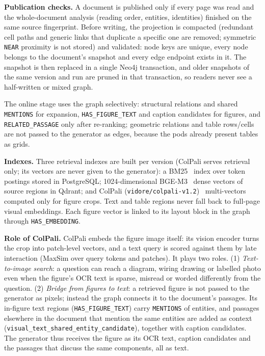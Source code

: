 \documentclass[conference]{IEEEtran}
\begin{document}
\textbf{Publication checks.} A document is published only if every page was read and the whole-document analysis (reading order, entities, identities) finished on the same source fingerprint. Before writing, the projection is compacted (redundant cell paths and generic links that duplicate a specific one are removed; symmetric \texttt{NEAR} proximity is not stored) and validated: node keys are unique, every node belongs to the document's snapshot and every edge endpoint exists in it. The snapshot is then replaced in a single Neo4j transaction, and older snapshots of the same version and run are pruned in that transaction, so readers never see a half-written or mixed graph.

The online stage uses the graph selectively: structural relations and shared \texttt{MENTIONS} for expansion, \texttt{HAS\_FIGURE\_TEXT} and caption candidates for figures, and \texttt{RELATED\_PASSAGE} only after re-ranking; geometric relations and table rows/cells are not passed to the generator as edges, because the pods already present tables as grids.

\textbf{Indexes.} Three retrieval indexes are built per version (ColPali serves retrieval only; its vectors are never given to the generator): a BM25~\cite{robertson2009bm25} index over token postings stored in PostgreSQL; 1024-dimensional BGE-M3~\cite{chen2024bgem3} dense vectors of source regions in Qdrant; and ColPali (\texttt{vidore/colpali-v1.2})~\cite{faysse2025colpali} multi-vectors computed only for figure crops. Text and table regions never fall back to full-page visual embeddings. Each figure vector is linked to its layout block in the graph through \texttt{HAS\_EMBEDDING}.

\textbf{Role of ColPali.} ColPali embeds the figure image itself: its vision encoder turns the crop into patch-level vectors, and a text query is scored against them by late interaction (MaxSim over query tokens and patches). It plays two roles. (1) \emph{Text-to-image search}: a question can reach a diagram, wiring drawing or labelled photo even when the figure's OCR text is sparse, misread or worded differently from the question. (2) \emph{Bridge from figures to text}: a retrieved figure is not passed to the generator as pixels; instead the graph connects it to the document's passages. Its in-figure text regions (\texttt{HAS\_FIGURE\_TEXT}) carry \texttt{MENTIONS} of entities, and passages elsewhere in the document that mention the same entities are added as context (\texttt{visual\_text\_shared\_entity\_candidate}), together with caption candidates. The generator thus receives the figure as its OCR text, caption candidates and the passages that discuss the same components, all as text.
\end{document}
